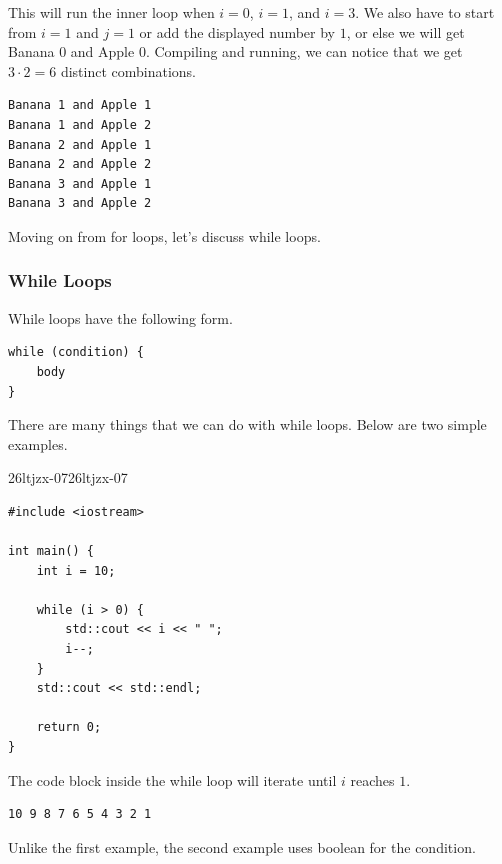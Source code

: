 \documentclass[../../../main.tex]{subfiles}
\begin{document}
This will run the inner loop when $i = 0$, $i = 1$, and $i = 3$.
We also have to start from $i = 1$ and $j = 1$ or add the
displayed number by $1$, or else we will get Banana $0$ and
Apple $0$. Compiling and running, we can notice that we get
$3 \cdot 2 = 6$ distinct combinations.

\begin{outputbox}
\begin{lstlisting}[style=basic]
Banana 1 and Apple 1
Banana 1 and Apple 2
Banana 2 and Apple 1
Banana 2 and Apple 2
Banana 3 and Apple 1
Banana 3 and Apple 2
\end{lstlisting}
\end{outputbox}

Moving on from for loops, let's discuss while loops.

\subsubsection{While Loops}

While loops have the following form.

\begin{basicbox}
\begin{lstlisting}[style=basic]
while (condition) {
    body
}
\end{lstlisting}
\end{basicbox}

There are many things that we can do with while loops. Below are
two simple examples.

\begin{cppbox}{26ltjzx-07}{26ltjzx-07}
\begin{lstlisting}[style=cppstyle]
#include <iostream>

int main() {
    int i = 10;

    while (i > 0) {
        std::cout << i << " ";
        i--;
    }
    std::cout << std::endl;

    return 0;
}
\end{lstlisting}
\end{cppbox}

The code block inside the while loop will iterate until $i$ reaches
$1$.

\begin{outputbox}
\begin{lstlisting}[style=basic]
10 9 8 7 6 5 4 3 2 1
\end{lstlisting}
\end{outputbox}

Unlike the first example, the second example uses boolean for the
condition.
\end{document}
